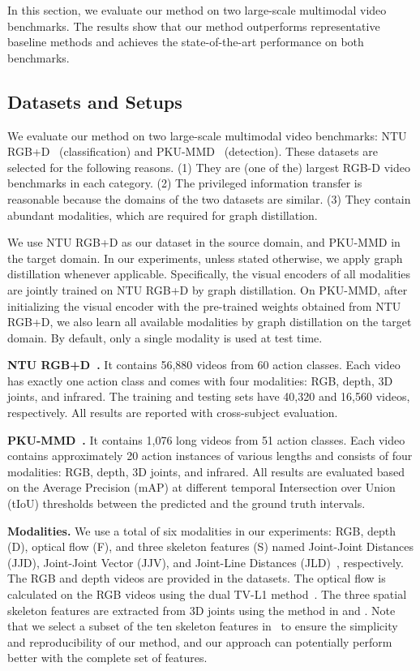 In this section, we evaluate our method on two large-scale multimodal video benchmarks. The results show that our method outperforms representative baseline methods and achieves the state-of-the-art performance on both benchmarks. 



\subsection{Datasets and Setups}\label{sec:dataset_setups}
We evaluate our method on two large-scale multimodal video benchmarks: NTU RGB+D~\cite{ntu_rgbd} (classification) and PKU-MMD~\cite{pku_mmd} (detection). These datasets are selected for the following reasons. (1) They are (one of the) largest RGB-D video benchmarks in each category. (2) The privileged information transfer is reasonable because the domains of the two datasets are similar. (3) They contain abundant modalities, which are required for graph distillation. 

We use NTU RGB+D as our dataset in the source domain, and PKU-MMD in the target domain. In our experiments, unless stated otherwise, we apply graph distillation whenever applicable. Specifically, the visual encoders of all modalities are jointly trained on NTU RGB+D by graph distillation. On PKU-MMD, after initializing the visual encoder with the pre-trained weights obtained from NTU RGB+D, we also learn all available modalities by graph distillation on the target domain. By default, only a single modality is used at test time.

\noindent\textbf{NTU RGB+D~\cite{ntu_rgbd}.} 
It contains 56,880 videos from 60 action classes. Each video has exactly one action class and comes with four modalities: RGB, depth, 3D joints, and infrared. The training and testing sets have 40,320 and 16,560 videos, respectively. All results are reported with cross-subject evaluation.

\noindent\textbf{PKU-MMD~\cite{pku_mmd}.} 
It contains 1,076 long videos from 51 action classes. Each video contains approximately 20 action instances of various lengths and consists of four modalities: RGB, depth, 3D joints, and infrared. All results are evaluated based on the Average Precision (mAP) at different temporal Intersection over Union (tIoU) thresholds between the predicted and the ground truth intervals.

\noindent\textbf{Modalities.} We use a total of six modalities in our experiments: RGB, depth (D), optical flow (F), and three skeleton features (S) named Joint-Joint Distances (JJD), Joint-Joint Vector (JJV), and Joint-Line Distances (JLD)~\cite{ding2017investigation,10-stream}, respectively. The RGB and depth videos are provided in the datasets. The optical flow is calculated on the RGB videos using the dual TV-L1 method~\cite{zach2007duality}. The three spatial skeleton features are extracted from 3D joints using the method in \cite{ding2017investigation} and \cite{10-stream}. Note that we select a subset of the ten skeleton features in~\cite{ding2017investigation,10-stream} to ensure the simplicity and reproducibility of our method, and our approach can potentially perform better with the complete set of features.

